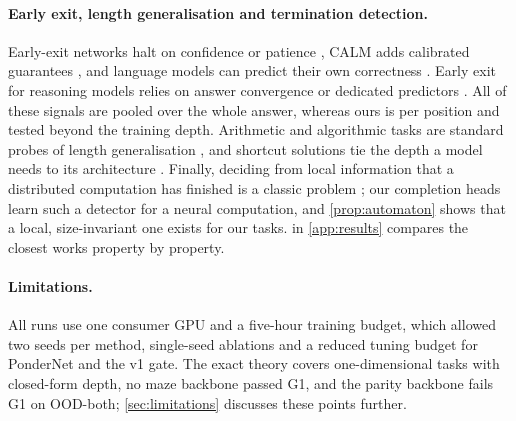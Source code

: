 \paragraph{Early exit, length generalisation and termination detection.} Early-exit networks halt on
confidence or patience \citep{teerapittayanon2016branchynet,elbayad2020depth,xin2020deebert,zhou2020pabee},
CALM adds calibrated guarantees \citep{schuster2022calm}, and language models can predict their own
correctness \citep{kadavath2022know}. Early exit for reasoning models relies on answer convergence or
dedicated predictors \citep{yang2025dynamic,liu2025convergence,nagle2026terminator,brown2026settle}. All of
these signals are pooled over the whole answer, whereas ours is per position and tested beyond the
training depth. Arithmetic and algorithmic tasks are standard probes of length generalisation
\citep{nogueira2021arithmetic,anil2022length,deletang2023chomsky,zhou2024raspl,mcleish2024embeddings}, and
shortcut solutions tie the depth a model needs to its architecture \citep{liu2023shortcuts}. Finally,
deciding from local information that a distributed computation has finished is a classic problem
\citep{dijkstra1980termination}; our completion heads learn such a detector for a neural computation, and
\cref{prop:automaton} shows that a local, size-invariant one exists for our tasks.  in
\cref{app:results} compares the closest works property by property.

\paragraph{Limitations.} All runs use one consumer GPU and a five-hour training budget, which allowed two
seeds per method, single-seed ablations and a reduced tuning budget for PonderNet and the v1 gate. The
exact theory covers one-dimensional tasks with closed-form depth, no maze backbone passed G1, and the
parity backbone fails G1 on OOD-both; \cref{sec:limitations} discusses these points further.
